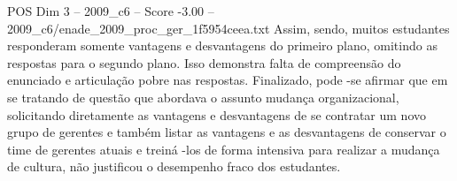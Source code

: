 \begin{textsample}{POS Dim 3 – 2009\_c6 – Score -3.00 – 2009\_c6/enade\_2009\_proc\_ger\_1f5954ceea.txt}
Assim, sendo, muitos estudantes responderam somente vantagens e desvantagens do primeiro plano, omitindo as respostas para o segundo plano.
Isso demonstra falta de compreensão do enunciado e articulação pobre nas respostas.
Finalizado, pode -se afirmar que em se tratando de questão que abordava o assunto mudança organizacional, solicitando diretamente as vantagens e desvantagens de se contratar um novo grupo de gerentes e também listar as vantagens e as desvantagens de conservar o time de gerentes atuais e treiná -los de forma intensiva para realizar a mudança de cultura, não justificou o desempenho fraco dos estudantes.

\end{textsample}
